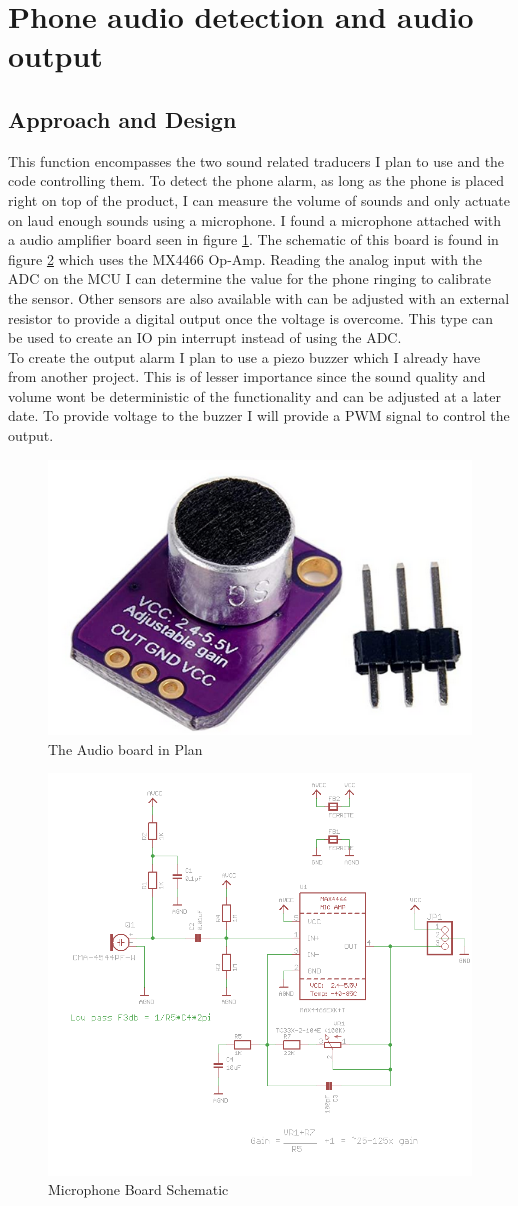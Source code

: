 \documentclass[11pt]{article}
\begin{document}
\section{Phone audio detection and audio output}
\subsection*{Approach and Design}
This function encompasses the two sound related traducers I plan to use and the code controlling them.
To detect the phone alarm, as long as the phone is placed right on top of the product, I can measure the volume of sounds and only actuate on laud enough sounds using a microphone. 
I found a microphone attached with a audio amplifier board seen in figure \ref{fig:audioboard}.
The schematic of this board is found in figure \ref{fig:audioscem} which uses the MX4466 Op-Amp.
Reading the analog input with the ADC on the MCU I can determine the value for the phone ringing to calibrate the sensor. 
Other sensors are also available with can be adjusted with an external resistor to provide a digital output once the voltage is overcome.
This type can be used to create an IO pin interrupt instead of using the ADC.\\

To create the output alarm I plan to use a piezo buzzer which I already have from another project.
This is of lesser importance since the sound quality and volume wont be deterministic of the functionality and can be adjusted at a later date.
To provide voltage to the buzzer I will provide a PWM signal to control the output. 
 
\begin{figure}
	\centering
	\includegraphics[width = 0.2\linewidth]{micBoard}
	\caption{The Audio board in Plan}
	\label{fig:audioboard}
\end{figure}
\begin{figure}
	\centering
	\includegraphics[width = 0.8\linewidth]{audioscem}
	\caption{Microphone Board Schematic}
	\label{fig:audioscem}
\end{figure}
\end{document}
